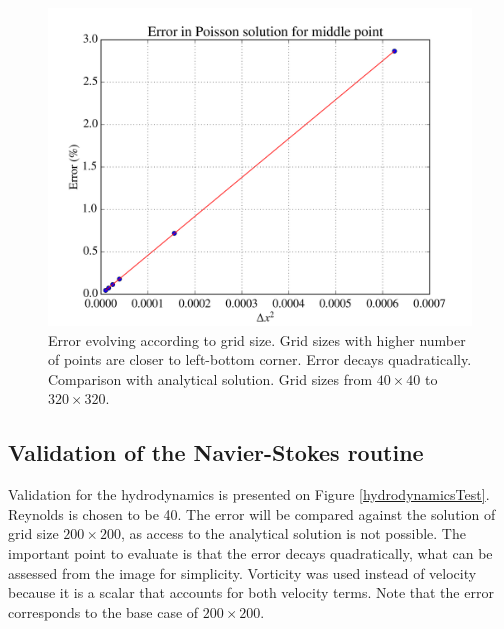 \documentclass[journal]{IEEEtran}
\begin{document}
\begin{figure}[!ht]
\centering
\includegraphics[width=\linewidth]{figures/validatePoissonP2}
\caption{Error evolving according to grid size. Grid sizes with higher number of points are closer to left-bottom corner. Error decays quadratically. Comparison with analytical solution. Grid sizes from $40\times 40$ to $320\times 320$. \label{errorPoissonTest}}
\end{figure}

\subsection{Validation of the Navier-Stokes routine}

Validation for the hydrodynamics is presented on Figure \ref{hydrodynamicsTest}. Reynolds is chosen to be 40. The error will be compared against the solution of grid size $200\times 200$, as access to the analytical solution is not possible. The important point to evaluate is that the error decays quadratically, what can be assessed from the image for simplicity. Vorticity was used instead of velocity because it is a scalar that accounts for both velocity terms. Note that the error corresponds to the base case of $200\times 200$.
\end{document}
